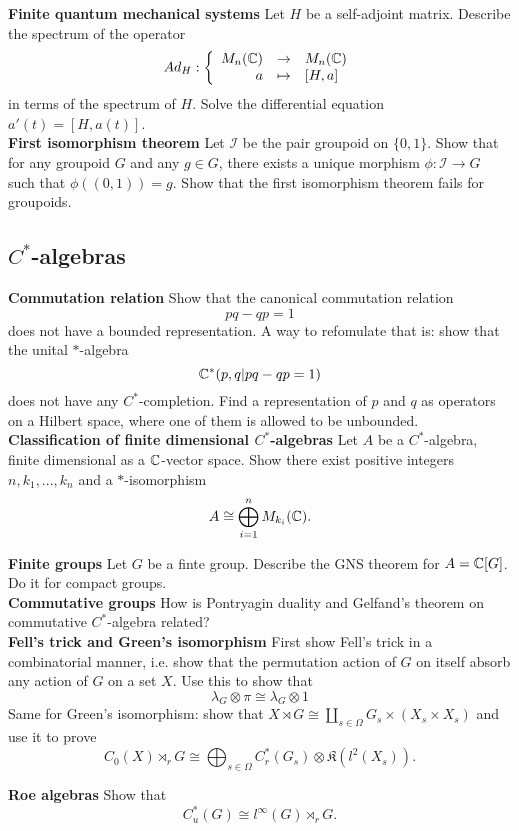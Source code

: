 \textbf{Finite quantum mechanical systems} Let $H$ be a self-adjoint matrix. Describe the spectrum of the operator
\[Ad_{H}:\left\{\begin{array}{rcl} M_n(\mathbb C) & \rightarrow & M_n(\mathbb C) \\ a & \mapsto & [H,a] \end{array}\right.\]
in terms of the spectrum of $H$. Solve the differential equation $a'(t) = [H,a(t)]$.\\

\textbf{First isomorphism theorem} Let $\mathcal I $ be the pair groupoid on $\{0,1\}$. Show that for any groupoid $G$ and any $g\in G$, there exists a unique morphism $\phi: \mathcal I \rightarrow G $ such that $\phi((0,1))=g$. Show that the first isomorphism theorem fails for groupoids. 

\subsection{$C^*$-algebras}

\textbf{Commutation relation} Show that the canonical commutation relation \[ pq-qp = 1\]
does not have a bounded representation. A way to refomulate that is: show that the unital $*$-algebra 
\[ \mathbb C^*( p,q | pq-qp =1)\]
does not have any $C^*$-completion. Find a representation of $p$ and $q$ as operators on a Hilbert space, where one of them is allowed to be unbounded. \\

\textbf{Classification of finite dimensional $C^*$-algebras} Let $A$ be a $C^*$-algebra, finite dimensional as a $\mathbb C$-vector space. Show there exist positive integers $n,k_1,...,k_n$ and a $*$-isomorphism
\[A\cong \bigoplus_{i=1}^n M_{k_i}(\mathbb C).\]

\textbf{Finite groups} Let $G$ be a finte group. Describe the GNS theorem for $A=\mathbb C[G]$. Do it for compact groups.\\

\textbf{Commutative groups} How is Pontryagin duality and Gelfand's theorem on commutative $C^*$-algebra related?\\

\textbf{Fell's trick and Green's isomorphism}
First show Fell's trick in a combinatorial manner, i.e. show that the permutation action of $G$ on itself absorb any action of $G$ on a set $X$. Use this to show that 
\[\lambda_G \otimes \pi \cong \lambda_G \otimes 1\]
Same for Green's isomorphism: show that $X\rtimes G \cong \coprod_{s\in \Omega} G_s\times (X_s\times X_s)$ and use it to prove
\[C_0(X)\rtimes_r G \cong \bigoplus_{s\in \Omega} C^*_r(G_s)\otimes \mathfrak K(l^2(X_s)). \]

\textbf{Roe algebras}
Show that 
\[C^*_u(G) \cong l^\infty(G)\rtimes_r G.\]

 
